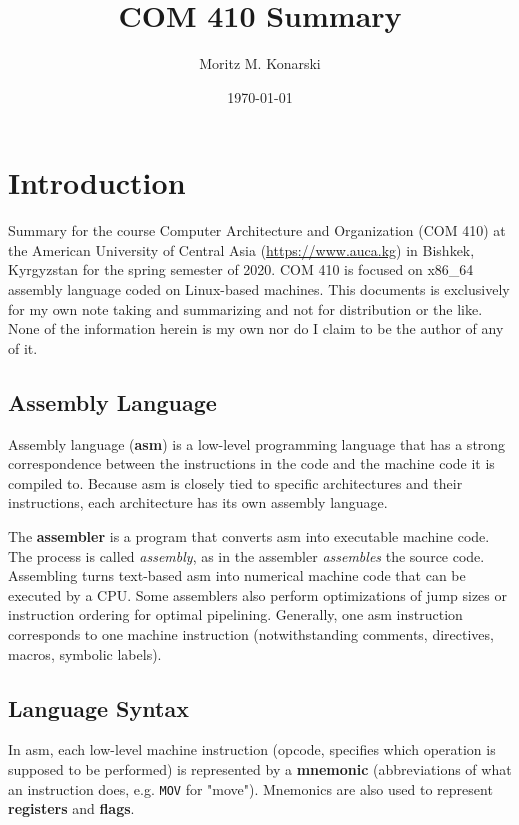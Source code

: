 \documentclass[reqno,a4paper,11pt]{amsart}
\begin{document}
\title{COM 410 Summary}
\author{Moritz M. Konarski}
\date{\today}

\maketitle
\tableofcontents

\section{Introduction}

Summary for the course Computer Architecture and Organization (COM 410) at the
American University of Central Asia (\url{https://www.auca.kg}) in Bishkek,
Kyrgyzstan for the spring semester of 2020. COM 410 is focused on x86\_64 
assembly language coded on Linux-based machines. This documents is exclusively
for my own note taking and summarizing and not for distribution or the like.
None of the information herein is my own nor do I claim to be the author of any
of it.

\subsection{Assembly Language}

Assembly language (\textbf{asm}) is a low-level programming language that has
a strong correspondence between the instructions in the code and the machine
code it is compiled to. Because asm is closely tied to specific architectures
and their instructions, each architecture has its own assembly language.

The \textbf{assembler} is a program that converts asm into executable machine
code. The process is called \textit{assembly}, as in the assembler
\textit{assembles} the source code. Assembling turns text-based asm into
numerical machine code that can be executed by a CPU. Some assemblers also
perform optimizations of jump sizes or instruction ordering for optimal
pipelining. Generally, one asm instruction corresponds to one  machine 
instruction (notwithstanding comments, directives, macros, symbolic labels).

\subsection{Language Syntax}

In asm, each low-level machine instruction (opcode, specifies which operation
is supposed to be performed) is represented by a \textbf{mnemonic}
(abbreviations of what an instruction does, e.g. \texttt{MOV} for "move"). 
Mnemonics are also used to represent \textbf{registers} and \textbf{flags}.
\end{document}
